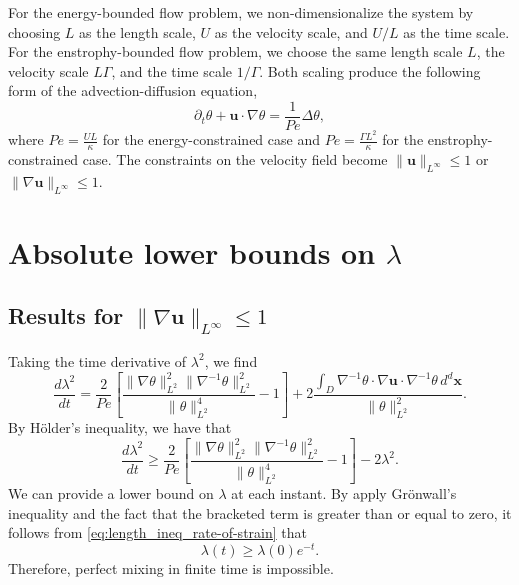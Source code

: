 \documentclass{jfm}
\newcommand{\ddt}[1]{\frac{d #1}{dt}}
\newcommand{\hmone}[1]{\|\nabla^{-1} #1\|_{L^{2}}}
\newcommand{\ltwo}[1]{\|#1\|_{L^{2}}}
\newcommand{\hone}[1]{\| \nabla #1\|_{L^{2}}}
\newcommand{\sint}[1]{\int_{D} #1 \, d^{d}\mathbf{x}}
\renewcommand{\vec}[1]{\mathbf{#1}}
\newcommand{\linf}[1]{\| #1 \|_{L^{\infty}}}
\renewcommand{\u}{\mathbf{u}}
\newcommand{\ppt}[1]{\partial_{t} #1}
\newcommand{\lap}{\Delta }
\begin{document}
For the energy-bounded flow problem, we non-dimensionalize the system by choosing $L$ as the length scale, $U$ as the velocity scale, and $U/L$ as the time scale. For the enstrophy-bounded flow problem, we choose the same length scale $L$, the velocity scale $L\Gamma $, and  the time scale $1/\Gamma$. Both scaling produce the following form of the advection-diffusion equation,
\begin{equation}
\label{eq:nd_ade}
	\ppt{\theta}+\mathbf{u}\cdot \nabla \theta=\frac{1}{Pe} \lap\theta,
\end{equation}
where $Pe= \frac{UL}{\kappa}$ for the energy-constrained case and  $Pe=  \frac{\Gamma L^2}{\kappa}$ for the enstrophy-constrained case. The constraints on the velocity field become $\linf{\u} \leq 1$ or $\linf{\nabla\u} \leq 1$.

\section{Absolute lower bounds on $\lambda$}

\subsection{Results for $\linf{\nabla \vec{u}} \leq 1$}

Taking the time derivative of $\lambda^2$, we find
%
\begin{equation}
	\ddt{\lambda^2} = \frac{2}{Pe}
		\left[ 
			\frac{\hone{\theta}^2\hmone{\theta}^2}
					{\ltwo{\theta}^4}  
			- 1
		\right]
		+ 2 \frac{\sint{\nabla^{-1}\theta \cdot \nabla\vec{u} \cdot 
							\nabla^{-1}\theta  }}
					  {\ltwo{\theta}^{2}}.
\end{equation}
By H\"older's inequality, we have that
\begin{equation}
\label{eq:length_ineq_rate-of-strain}
	\ddt{\lambda^2} \geq \frac{2}{Pe} \left[ 
			\frac{\hone{\theta}^2\hmone{\theta}^2}
					{\ltwo{\theta}^4}  
			- 1
		\right] - 2  \lambda^2 .
\end{equation}
We can provide a lower bound on $\lambda$ at each instant. By apply Gr\"onwall's inequality and the fact that the bracketed term is greater than or equal to zero, it follows from \eqref{eq:length_ineq_rate-of-strain} that
%
\begin{equation}
\label{eq:exponential_enstrophy}
	\lambda (t) \geq \lambda(0)e^{- t}.
\end{equation}
%
Therefore, perfect mixing in finite time is impossible.
\end{document}
